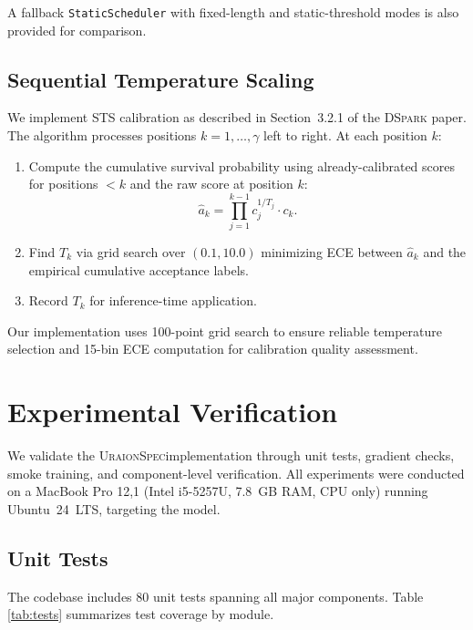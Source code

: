 \documentclass[11pt,a4paper]{article}
\newcommand{\UraionSpec}{\textsc{UraionSpec}}
\newcommand{\DSpark}{\textsc{DSpark}}
\begin{document}
A fallback \texttt{StaticScheduler} with fixed-length and static-threshold
modes is also provided for comparison.

\subsection{Sequential Temperature Scaling}
\label{subsec:sts}

We implement STS calibration as described in Section~3.2.1 of the \DSpark
paper. The algorithm processes positions $k = 1, \ldots, \gamma$ left to
right. At each position $k$:

\begin{enumerate}
  \item Compute the cumulative survival probability using already-calibrated
    scores for positions $<k$ and the raw score at position $k$:
    \[
    \hat{a}_k = \prod_{j=1}^{k-1} c_j^{1/T_j} \cdot c_k.
    \]
  \item Find $T_k$ via grid search over $(0.1, 10.0)$ minimizing ECE
    between $\hat{a}_k$ and the empirical cumulative acceptance labels.
  \item Record $T_k$ for inference-time application.
\end{enumerate}

Our implementation uses 100-point grid search to ensure reliable temperature
selection and 15-bin ECE computation for calibration quality assessment.

\section{Experimental Verification}
\label{sec:experiments}

We validate the \UraionSpec implementation through unit tests, gradient
checks, smoke training, and component-level verification. All experiments
were conducted on a MacBook Pro 12,1 (Intel i5-5257U, 7.8~GB RAM, CPU only)
running Ubuntu~24~LTS, targeting the  model.

\subsection{Unit Tests}
\label{subsec:unit-tests}

The codebase includes 80 unit tests spanning all major components. Table
\ref{tab:tests} summarizes test coverage by module.
\end{document}
